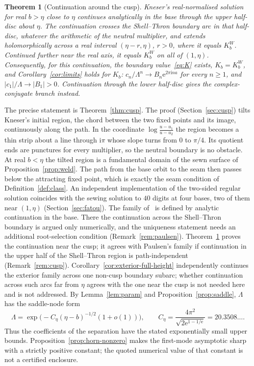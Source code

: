 \documentclass[11pt]{amsart}
\newtheorem{maintheorem}{Theorem}
\theoremstyle{definition}
\newcommand{\Kk}{K}
\newcommand{\eee}{\mathrm{e}}
\newcommand{\ii}{\mathrm{i}}
\begin{document}
\begin{maintheorem}[Continuation around the cusp]\label{mthm:F}
Kneser's real-normalised solution for real $b>\eta$ close to $\eta$
continues analytically in the base through the upper half-disc about $\eta$.
The continuation crosses the Shell--Thron boundary arc in that half-disc,
whatever the arithmetic of the neutral multiplier, and extends
holomorphically across a real interval $(\eta-r,\eta)$, $r>0$, where it equals $\Kk^W_b$.
Continued further near the real axis, it equals $\Kk^W_b$ on all of $(1,\eta)$.
Consequently, for this continuation, the boundary value~\eqref{eq:K} exists,
$\Kk_b=\Kk^W_b$, and Corollary~\ref{cor:limits} holds for $\Kk_b$: $c_n/\Lambda^n\to B_n\eee^{2\pi\ii na}$
for every $n\ge1$, and $|c_1|/\Lambda\to|B_1|>0$.  Continuation through the lower
half-disc gives the complex-conjugate branch instead.
\end{maintheorem}

The precise statement is Theorem~\ref{thm:cusp}.  The proof
(Section~\ref{sec:cusp}) tilts Kneser's initial region, the chord between the
two fixed points and its image, continuously along the path.  In the
coordinate $\log\frac{u-u_1}{u-u_2}$ the region becomes a thin strip about a line
through $\ii\pi$ whose slope turns from $0$ to $\pi/4$.  Its quotient ends are
punctures for every multiplier, so the neutral boundary is no obstacle.  At
real $b<\eta$ the tilted region is a fundamental domain of the sewn surface of
Proposition~\ref{prop:weld}.  The path from the base orbit to the seam then passes
below the attracting fixed point, which is exactly the seam condition of
Definition~\ref{def:class}.  An independent implementation of the two-sided
regular solution coincides with the sewing solution to $40$ digits at four
bases, two of them near $(1,\eta)$ (Section~\ref{sec:fatou}).  The family
of~\cite{Paulsen2019} is defined by analytic continuation in the base.  There
the continuation across the Shell--Thron boundary is argued only numerically,
and the uniqueness statement needs an additional root-selection condition
(Remark~\ref{rem:paulsen}).  Theorem~\ref{mthm:F} proves the continuation near the
cusp; it agrees with Paulsen's family if continuation in the upper half of
the Shell--Thron region is path-independent (Remark~\ref{rem:cusp}).  Corollary~\ref{cor:exterior-full-height} independently
continues the exterior family across one non-cusp boundary subarc; whether
continuation across such arcs far from $\eta$ agrees with the one near the
cusp is not needed here and is not addressed.
By Lemma~\ref{lem:param} and Proposition~\ref{prop:saddle}, $\Lambda$ has the
saddle-node form
\[
 \Lambda=\exp\bigl(-C_\eta(\eta-b)^{-1/2}(1+o(1))\bigr),\qquad
 C_\eta=\frac{4\pi^2}{\sqrt{2\eee^{1-1/\eee}}}=20.3508\ldots .
\]
Thus the coefficients of the separation have the stated exponentially
small upper bounds.  Proposition~\ref{prop:horn-nonzero} makes the
first-mode asymptotic sharp with a strictly positive constant; the quoted
numerical value of that constant is not a certified enclosure.
\end{document}
